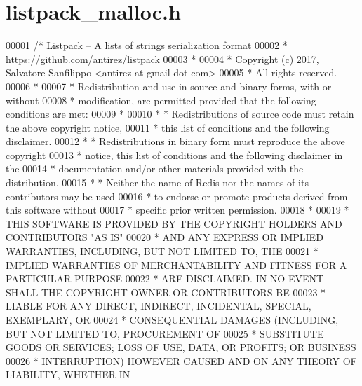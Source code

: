 \hypertarget{listpack__malloc_8h_source}{}\section{listpack\+\_\+malloc.\+h}
\label{listpack__malloc_8h_source}

\begin{DoxyCode}
00001 \textcolor{comment}{/* Listpack -- A lists of strings serialization format}
00002 \textcolor{comment}{ * https://github.com/antirez/listpack}
00003 \textcolor{comment}{ *}
00004 \textcolor{comment}{ * Copyright (c) 2017, Salvatore Sanfilippo <antirez at gmail dot com>}
00005 \textcolor{comment}{ * All rights reserved.}
00006 \textcolor{comment}{ *}
00007 \textcolor{comment}{ * Redistribution and use in source and binary forms, with or without}
00008 \textcolor{comment}{ * modification, are permitted provided that the following conditions are met:}
00009 \textcolor{comment}{ *}
00010 \textcolor{comment}{ *   * Redistributions of source code must retain the above copyright notice,}
00011 \textcolor{comment}{ *     this list of conditions and the following disclaimer.}
00012 \textcolor{comment}{ *   * Redistributions in binary form must reproduce the above copyright}
00013 \textcolor{comment}{ *     notice, this list of conditions and the following disclaimer in the}
00014 \textcolor{comment}{ *     documentation and/or other materials provided with the distribution.}
00015 \textcolor{comment}{ *   * Neither the name of Redis nor the names of its contributors may be used}
00016 \textcolor{comment}{ *     to endorse or promote products derived from this software without}
00017 \textcolor{comment}{ *     specific prior written permission.}
00018 \textcolor{comment}{ *}
00019 \textcolor{comment}{ * THIS SOFTWARE IS PROVIDED BY THE COPYRIGHT HOLDERS AND CONTRIBUTORS "AS IS"}
00020 \textcolor{comment}{ * AND ANY EXPRESS OR IMPLIED WARRANTIES, INCLUDING, BUT NOT LIMITED TO, THE}
00021 \textcolor{comment}{ * IMPLIED WARRANTIES OF MERCHANTABILITY AND FITNESS FOR A PARTICULAR PURPOSE}
00022 \textcolor{comment}{ * ARE DISCLAIMED. IN NO EVENT SHALL THE COPYRIGHT OWNER OR CONTRIBUTORS BE}
00023 \textcolor{comment}{ * LIABLE FOR ANY DIRECT, INDIRECT, INCIDENTAL, SPECIAL, EXEMPLARY, OR}
00024 \textcolor{comment}{ * CONSEQUENTIAL DAMAGES (INCLUDING, BUT NOT LIMITED TO, PROCUREMENT OF}
00025 \textcolor{comment}{ * SUBSTITUTE GOODS OR SERVICES; LOSS OF USE, DATA, OR PROFITS; OR BUSINESS}
00026 \textcolor{comment}{ * INTERRUPTION) HOWEVER CAUSED AND ON ANY THEORY OF LIABILITY, WHETHER IN}

\end{DoxyCode}
